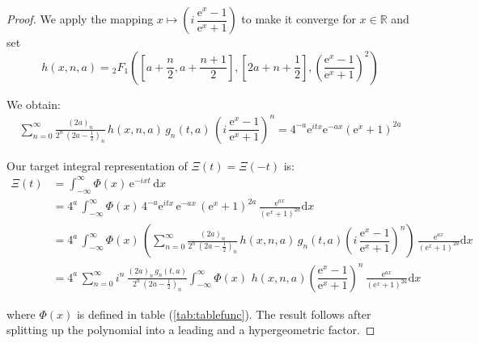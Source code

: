 \documentclass[a4paper,11pt,twoside]{amsart}
\newcommand{\verifiedeq}{=}
\newcommand{\defeq}{=}
\newcommand{\verifiedeq}{\stackrel{\checkmark}{=}}
\newcommand{\defeq}{\stackrel{\scriptscriptstyle \textnormal{def}}{=}}
\begin{document}
\begin{proof}
We apply the mapping $x \mapsto \left(i\,\dfrac{\textrm{e}^{x}-1}{\textrm{e}^{x}+1}\right)$ to make it converge for $x \in \mathbb{R}$ and set $$h(x,n,a) \defeq {}_2F_1\left(\left[a+\frac{n}{2}, a+\frac{n+1}{2}\right],\left[2a+n+\frac12\right],\left(\dfrac{\textrm{e}^{x}-1}{\textrm{e}^{x}+1}\right)^2\right)$$

We obtain:
\begin{align}
 \sum_{n=0}^\infty \frac{(2a)_n}{2^n\,\left(2a-\frac12\right)_n}\,h(x,n,a) \,g_n(t,a)\,\left(i\,\dfrac{\textrm{e}^{x}-1}{\textrm{e}^{x}+1}\right)^n \verifiedeq 4^{-a}\mathrm{e}^{itx}\mathrm{e}^{-ax}\left(\mathrm{e}^x+1\right)^{2a} 
\end{align}

Our target integral representation of $\Xi(t) = \Xi(-t)$ is:
\begin{align}
  \Xi(t)&\verifiedeq\int_{-\infty}^\infty \Phi(x)\,\mathrm{e}^{-ixt}\, \mathrm{d}x\\
  &\verifiedeq 4^a\, \int_{-\infty}^\infty \Phi(x)\,4^{-a}\mathrm{e}^{itx}\,\mathrm{e}^{-ax}\,\left(\mathrm{e}^x+1\right)^{2a}\,\frac{\mathrm{e}^{ax}}{\left(\mathrm{e}^x+1\right)^{2a}} \mathrm{d}x \\
   &\verifiedeq 4^a\,\int_{-\infty}^\infty \Phi(x)\, \left(\sum_{n=0}^\infty \frac{(2a)_n}{2^n\,\left(2a-\frac12\right)_n}\,h(x,n,a) \,g_n(t,a)\left(i\,\dfrac{\textrm{e}^{x}-1}{\textrm{e}^{x}+1}\right)^n\right)\,\frac{\mathrm{e}^{ax}}{\left(\mathrm{e}^x+1\right)^{2a}} \mathrm{d}x\\
   &\verifiedeq 4^a\, \sum_{n=0}^\infty i^n\,\frac{(2a)_n \,g_n(t,a)}{2^n\,\left(2a-\frac12\right)_n}\int_{-\infty}^\infty \Phi(x)\,\,h(x,n,a)\left(\dfrac{\textrm{e}^{x}-1}{\textrm{e}^{x}+1}\right)^n\,\frac{\mathrm{e}^{ax}}{\left(\mathrm{e}^x+1\right)^{2a}} \mathrm{d}x
\end{align}

where $\Phi(x)$ is defined in table (\ref{tab:tablefunc}). The result follows after splitting up the polynomial into a leading and a hypergeometric factor.
\end{proof}
\end{document}
